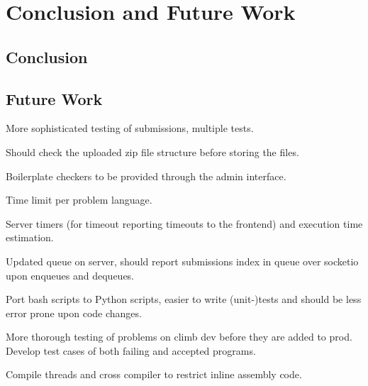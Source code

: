 \chapter{Conclusion and Future Work}

\section{Conclusion}

\section{Future Work}

More sophisticated testing of submissions, multiple tests.

Should check the uploaded zip file structure before storing the files.

Boilerplate checkers to be provided through the admin interface.

Time limit per problem language.

Server timers (for timeout reporting timeouts to the frontend) and execution time estimation.

Updated queue on server, should report submissions index in queue over socketio upon enqueues and dequeues.

Port bash scripts to Python scripts, easier to write (unit-)tests and should be less error prone upon code changes.

More thorough testing of problems on climb dev before they are added to prod. Develop test cases of both failing and accepted programs.

Compile threads and cross compiler to restrict inline assembly code.

